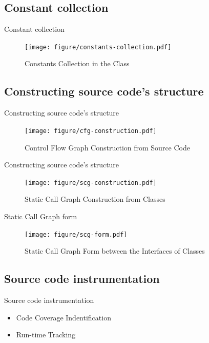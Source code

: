 \documentclass{beamer}
\begin{document}
\subsection{Constant collection}
\begin{frame}{Constant collection}
    \begin{figure}
        \texttt{[image: figure/constants-collection.pdf]}
        \caption{Constants Collection in the Class}
        \label{fig:constantsCollection}
    \end{figure}
\end{frame}

\subsection{Constructing source code's structure}
\begin{frame}{Constructing source code's structure}
    \begin{figure}
        \texttt{[image: figure/cfg-construction.pdf]}
        \caption{Control Flow Graph Construction from Source Code}
        \label{fig:cfgConstruct}
    \end{figure}
\end{frame}

\begin{frame}{Constructing source code's structure}
    \begin{figure}
        \texttt{[image: figure/scg-construction.pdf]}
        \caption{Static Call Graph Construction from Classes}
        \label{fig:scgConstruct}
    \end{figure}
\end{frame}

\begin{frame}{Static Call Graph form}
    \begin{figure}
        \texttt{[image: figure/scg-form.pdf]}
        \caption{Static Call Graph Form between the Interfaces of Classes}
        \label{fig:scgForm}
    \end{figure}
\end{frame}

\subsection{Source code instrumentation}
\begin{frame}{Source code instrumentation}
    \begin{itemize}
        \item<1-> Code Coverage Indentification
        \item<2-> Run-time Tracking
    \end{itemize}
\end{frame}
\end{document}
